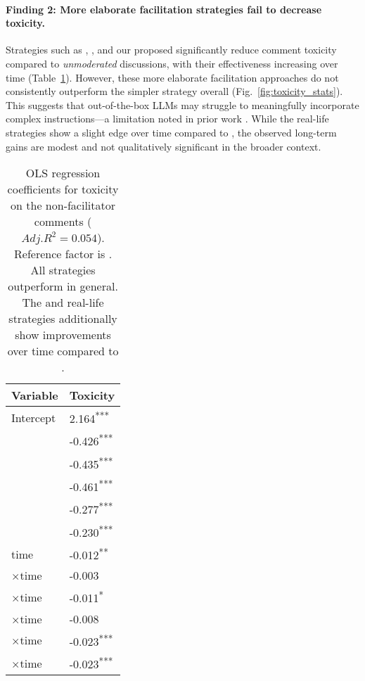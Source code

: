 \paragraph{Finding 2: More elaborate facilitation strategies fail to decrease toxicity.}
Strategies such as \emph{\strategyregroom}, \emph{\strategyconstrcomm}, and our proposed \emph{\strategymodgame} significantly reduce comment toxicity compared to \emph{unmoderated} discussions, with their effectiveness increasing over time (Table~\ref{tab:toxicity}). However, these more elaborate facilitation approaches do not consistently outperform the simpler \emph{\strategynoinstr} strategy overall (Fig.~\ref{fig:toxicity_stats}). This suggests that out-of-the-box LLMs may struggle to meaningfully incorporate complex instructions—a limitation noted in prior work \cite{cho-etal-2024-language}. While the real-life strategies show a slight edge over time compared to \emph{\strategynoinstr}, the observed long-term gains are modest and not qualitatively significant in the broader context.

\begin{table}[t]
	\centering
	\begin{tabular}{p{5cm} p{1.5cm}}
		\toprule
		\textbf{Variable} & \textbf{Toxicity} \\
		\midrule
		Intercept & 2.164\textsuperscript{***} \\
		\strategynoinstr & -0.426\textsuperscript{***} \\
		\strategymodgame & -0.435\textsuperscript{***} \\
		\strategyrules & -0.461\textsuperscript{***} \\
		\strategyregroom & -0.277\textsuperscript{***} \\
		\strategyconstrcomm & -0.230\textsuperscript{***} \\
		time & -0.012\textsuperscript{**} \\
		\strategynoinstr$\times$time & -0.003 \\
		\strategymodgame$\times$time & -0.011\textsuperscript{*} \\
		\strategyrules$\times$time & -0.008 \\
		\strategyregroom$\times$time & -0.023\textsuperscript{***} \\
		\strategyconstrcomm$\times$time & -0.023\textsuperscript{***} \\
		\bottomrule
	\end{tabular}
	\small
	\asterisknote
	\normalsize
	\caption{OLS regression coefficients for toxicity on the non-facilitator comments ($Adj. R^2=0.054$). Reference factor is \textit{\strategynomod}. All strategies outperform \textit{\strategynomod} in general. The \textit{\strategyregroom} and \textit{\strategyconstrcomm} real-life strategies additionally show improvements over time compared to \textit{\strategynomod}.}
	\label{tab:toxicity}
\end{table}



